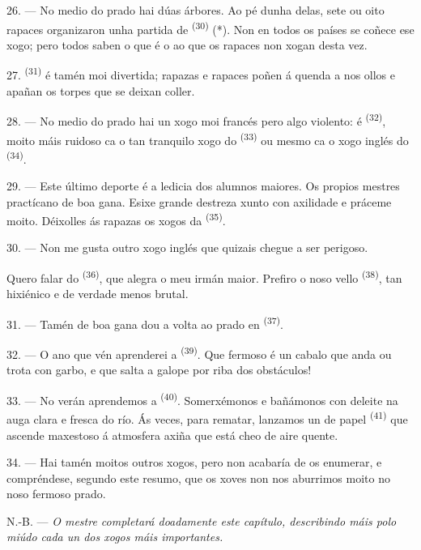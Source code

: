 26. --- No medio do prado hai dúas árbores. Ao pé dunha delas, sete ou oito rapaces
organizaron unha partida de  \textsuperscript{(30)} (*). Non en
todos os países se coñece ese xogo; pero todos saben o que é o  ao
que os rapaces non xogan desta vez.

\VUsaut{5.0mm}
\VUsaut{3.4mm}

27.  \textsuperscript{(31)} é tamén moi divertida; rapazas e rapaces poñen
á quenda a  nos ollos e apañan os torpes que se deixan coller.

28. --- No medio do prado hai un xogo moi francés pero algo violento: é
 \textsuperscript{(32)}, moito máis ruidoso ca o tan tranquilo xogo do
 \textsuperscript{(33)} ou mesmo ca o xogo inglés do
 \textsuperscript{(34)}.

29. --- Este último deporte é a ledicia dos alumnos maiores. Os propios mestres practícano de
boa gana. Esixe grande destreza xunto con axilidade e práceme moito. Déixolles ás rapazas os
xogos da  \textsuperscript{(35)}.

30. --- Non me gusta outro xogo inglés que quizais chegue a ser perigoso.

Quero falar do  \textsuperscript{(36)}, que alegra o meu irmán maior. Prefiro o
noso vello  \textsuperscript{(38)}, tan hixiénico e de verdade menos
brutal.

\VUsaut{4.6mm}
\VUsaut{3.0mm}

31. --- Tamén de boa gana dou a volta ao prado en  \textsuperscript{(37)}.

32. --- O ano que vén aprenderei a  \textsuperscript{(39)}. Que
fermoso é un cabalo que anda ou trota con garbo, e que salta a galope por riba dos obstáculos!

33. --- No verán aprendemos a  \textsuperscript{(40)}. Somerxémonos e bañámonos
con deleite na auga clara e fresca do río. Ás veces, para rematar, lanzamos un 
de papel \textsuperscript{(41)} que ascende maxestoso á atmosfera axiña que está cheo de aire
quente.

34. --- Hai tamén moitos outros xogos, pero non acabaría de os enumerar, e compréndese,
segundo este resumo, que os xoves non nos aburrimos moito no noso fermoso prado.

N.-B. --- \textit{O mestre completará doadamente este capítulo, describindo máis polo miúdo
cada un dos xogos máis importantes.}
